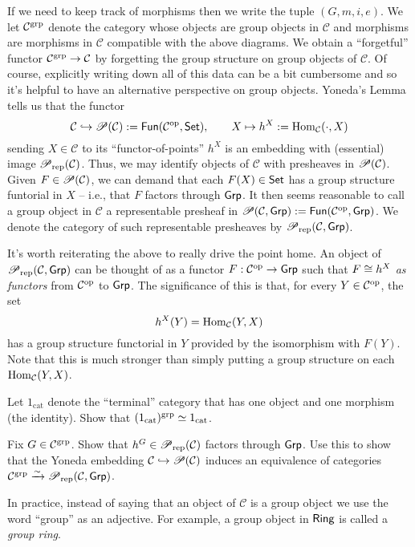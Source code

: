 \documentclass[11pt]{article}
\renewcommand{\C}{\mathcal{C}}
\DeclareMathOperator{\cat}{cat} %
\begin{document}
If we need to keep track of morphisms then we write the tuple $(G,m,i,e)$. We let $\C^{\grp}$ denote the category whose objects are group objects in $\C$ and morphisms are morphisms in $\C$ compatible with the above diagrams. We obtain a ``forgetful'' functor $\C^{\grp}\to\C$ by forgetting the group structure on group objects of $\C$. Of course, explicitly writing down all of this data can be a bit cumbersome and so it's helpful to have an alternative perspective on group objects. Yoneda's Lemma tells us that the functor
$$\C\inj\Pre(\C):=\Fun(\C^{\op},\Set),\qquad X\mapsto h^X:=\Hom_{\C}(\cdot,X)$$
sending $X\in\C$ to its ``functor-of-points'' $h^X$ is an embedding with (essential) image $\Pre_{\rep}(\C)$. Thus, we may identify objects of $\C$ with presheaves in $\Pre(\C)$. Given $F\in\Pre(\C)$, we can demand that each $F(X)\in\operatorname{\mathsf{Set}}$ has a group structure funtorial in $X$ -- i.e., that $F$ factors through $\operatorname{\mathsf{Grp}}$. It then seems reasonable to call a group object in $\C$ a representable presheaf in $\Pre(\C,\Grp):=\Fun(\C^{\op},\Grp)$. We denote the category of such representable presheaves by $\Pre_{\rep}(\C,\Grp)$.

\begin{remark}
It's worth reiterating the above to really drive the point home. An object of $\Pre_{\rep}(\C,\Grp)$ can be thought of as a functor $F: \C^{\op}\to\Grp$ such that $F\cong h^X$ \emph{as functors} from $\C^{\op}$ to $\operatorname{\mathsf{Grp}}$. The significance of this is that, for every $Y\in\C^{\op}$, the set
$$h^X(Y)=\Hom_{\C}(Y,X)$$
has a group structure functorial in $Y$ provided by the isomorphism with $F(Y)$. Note that this is much stronger than simply putting a group structure on each $\Hom_{\C}(Y,X)$.
\end{remark}

\begin{exercise}
Let $1_{\cat}$ denote the ``terminal'' category that has one object and one morphism (the identity). Show that $(1_{\cat})^{\grp}\simeq1_{\cat}$.
\end{exercise}

\begin{exercise}
Fix $G\in\C^{\grp}$. Show that $h^G\in\Pre_{\rep}(\C)$ factors through $\operatorname{\mathsf{Grp}}$. Use this to show that the Yoneda embedding $\C\inj\Pre(\C)$ induces an equivalence of categories $\C^{\grp}\xto{\sim}\Pre_{\rep}(\C,\Grp)$.
\end{exercise}

In practice, instead of saying that an object of $\C$ is a group object we use the word ``group'' as an adjective. For example, a group object in $\operatorname{\mathsf{Ring}}$ is called a \emph{group ring}.
\end{document}
